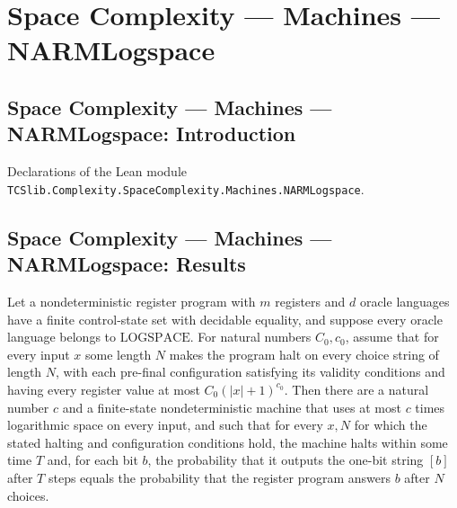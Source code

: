 \section{Space Complexity --- Machines --- NARMLogspace}
\subsection*{Space Complexity --- Machines --- NARMLogspace: Introduction}

Declarations of the Lean module \texttt{TCSlib.Complexity.SpaceComplexity.Machines.NARMLogspace}.

\subsection*{Space Complexity --- Machines --- NARMLogspace: Results}

\begin{theorem}
\label{Complexity.LogProg.narm_logspace_ptm}
\leanok
{}
Let a nondeterministic register program with $m$ registers and $d$ oracle languages have
a finite control-state set with decidable equality, and suppose every oracle language
belongs to $\text{LOGSPACE}$. For natural numbers $C_0,c_0$, assume that for every
input $x$ some length $N$ makes the program halt on every choice string of length $N$,
with each pre-final configuration satisfying its validity conditions and having every
register value at most $C_0(|x|+1)^{c_0}$. Then there are a natural number $c$ and a
finite-state nondeterministic machine that uses at most $c$ times logarithmic space on
every input, and such that for every $x,N$ for which the stated halting and
configuration conditions hold, the machine halts within some time $T$ and, for each bit
$b$, the probability that it outputs the one-bit string $[b]$ after $T$ steps equals the
probability that the register program answers $b$ after $N$ choices.
\end{theorem}

